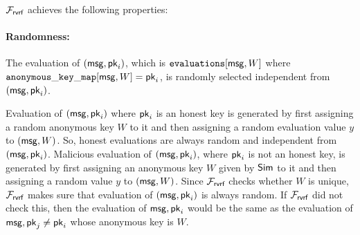 %
%
$ \mathcal{F}_{\textsf{rvrf}} $  achieves the following properties:

\paragraph{Randomness:}  The evaluation of $ (\mathsf{msg}, \mathsf{pk}_i) $,  which is $ \texttt{evaluations}[\mathsf{msg},W] $ where $ \mathtt{anonymous\_key\_map}[\mathsf{msg},W] = \mathsf{pk}_i $, is randomly selected independent from $ (\mathsf{msg}, \mathsf{pk}_i) $.


 Evaluation of $ (\mathsf{msg}, \mathsf{pk}_i) $ where $ \mathsf{pk}_i $ is an honest key is generated by first assigning a random anonymous key $ W $ to it and then assigning a random evaluation value $ y $ to $ (\mathsf{msg}, W)$. So, honest evaluations are always random and independent from $ (\mathsf{msg},\mathsf{pk}_i) $. Malicious evaluation of $ (\mathsf{msg}, \mathsf{pk}_i) $, where $ \mathsf{pk}_i $ is not an honest key, is generated by first assigning an anonymous key $ W $ given by $ \mathsf{Sim} $ to it and then assigning a random value $ y $ to $ (\mathsf{msg}, W) $. Since $ \mathcal{F}_{\textsf{rvrf}} $ checks whether $ W $ is unique, $ \mathcal{F}_{\textsf{rvrf}} $ makes sure that evaluation of $ (\mathsf{msg}, \mathsf{pk}_i) $ is always random. If $ \mathcal{F}_{\textsf{rvrf}} $ did not check this, then the evaluation of $ \mathsf{msg}, \mathsf{pk}_i $ would be the same as the evaluation of $ \mathsf{msg}, \mathsf{pk}_j  \neq \mathsf{pk}_i$ whose anonymous key is $ W $.





